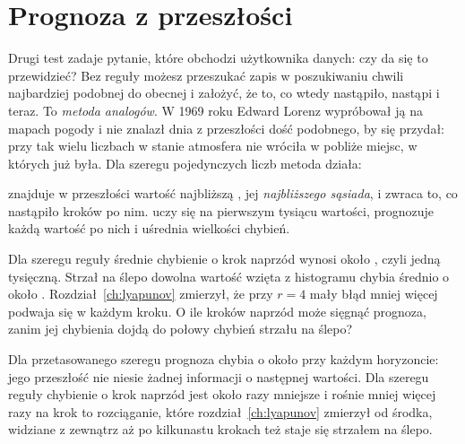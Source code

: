 \section{Prognoza z przeszłości}
\label{sec:ch15-analogues}

\noindent
Drugi test zadaje pytanie, które obchodzi użytkownika danych: czy da się to
przewidzieć? Bez reguły możesz przeszukać zapis w poszukiwaniu chwili
najbardziej podobnej do obecnej i założyć, że to, co wtedy nastąpiło, nastąpi
i teraz. To \emph{metoda analogów}. W 1969 roku Edward Lorenz wypróbował ją na
mapach pogody i nie znalazł dnia z przeszłości dość podobnego, by się
przydał: przy tak wielu liczbach w stanie atmosfera nie wróciła w pobliże
miejsc, w których już była. Dla szeregu pojedynczych liczb metoda działa:


\noindent
{} znajduje w przeszłości wartość najbliższą , jej
\emph{najbliższego sąsiada}, i zwraca to, co nastąpiło  kroków po
nim.  uczy się na pierwszym tysiącu wartości, prognozuje
każdą wartość po nich i uśrednia wielkości chybień.

\begin{think}
Dla szeregu reguły średnie chybienie o krok naprzód wynosi około
, czyli jedną tysięczną. Strzał na ślepo \dash{} dowolna
wartość wzięta z histogramu \dash{} chybia średnio o około .
Rozdział~\ref{ch:lyapunov} zmierzył, że przy $r = 4$ mały błąd mniej więcej
podwaja się w każdym kroku. O ile kroków naprzód może sięgnąć prognoza, zanim
jej chybienia dojdą do połowy chybień strzału na ślepo?
\end{think}



\noindent
Dla przetasowanego szeregu prognoza chybia o około  przy
każdym horyzoncie: jego przeszłość nie niesie żadnej informacji o następnej
wartości. Dla szeregu reguły chybienie o krok naprzód jest około
 razy mniejsze i rośnie mniej więcej 
razy na krok \dash{} to rozciąganie, które rozdział~\ref{ch:lyapunov} zmierzył
od środka, widziane z zewnątrz \dash{} aż po kilkunastu krokach też staje się
strzałem na ślepo.

